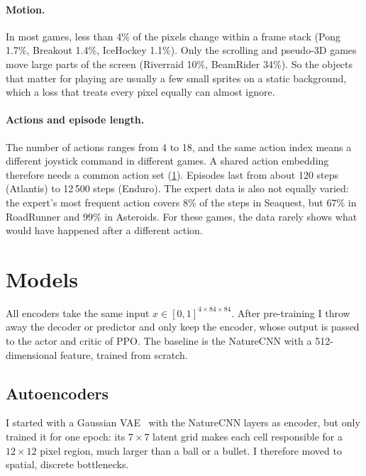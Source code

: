 \documentclass[runningheads]{llncs}
\begin{document}
\paragraph{Motion.} In most games, less than 4\% of the pixels change within a frame stack
(Pong 1.7\%, Breakout 1.4\%, IceHockey 1.1\%). Only the scrolling and pseudo-3D games move large
parts of the screen (Riverraid 10\%, BeamRider 34\%). So the objects that matter for playing
are usually a few small sprites on a static background, which a loss that treats every pixel
equally can almost ignore.

\paragraph{Actions and episode length.} The number of actions ranges from 4 to 18, and the same
action index means a different joystick command in different games. A shared action embedding
therefore needs a common action set (\cref{sec:models}). Episodes last
from about 120 steps (Atlantis) to 12\,500 steps (Enduro). The expert data is also not equally
varied: the expert's most frequent action covers 8\% of the steps in Seaquest, but 67\% in
RoadRunner and 99\% in Asteroids. For these games, the data rarely shows what would have
happened after a different action.

\section{Models}
\label{sec:models}

All encoders take the same input $x\in[0,1]^{4\times84\times84}$. After pre-training I throw
away the decoder or predictor and only keep the encoder, whose output is passed to the actor
and critic of PPO. The baseline is the NatureCNN with a 512-dimensional feature, trained from
scratch.

\subsection{Autoencoders}

I started with a Gaussian VAE~\cite{kingma2014vae} with the NatureCNN layers as encoder,
but only trained it for one epoch: its $7\times7$ latent grid makes each cell responsible for a
$12\times12$ pixel region, much larger than a ball or a bullet. I therefore moved to spatial,
discrete bottlenecks.
\end{document}
